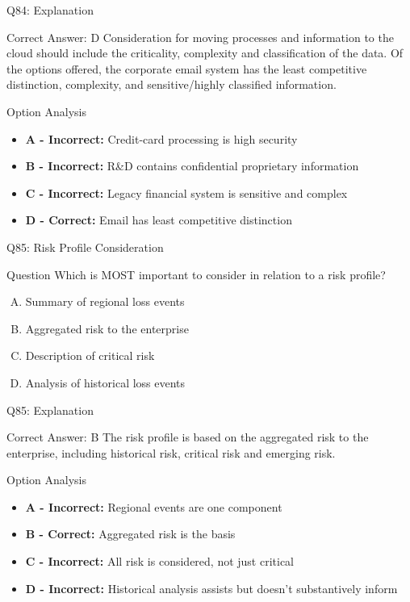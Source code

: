 \documentclass{beamer}
\begin{document}
	\begin{frame}{Q84: Explanation}
		\begin{block}{Correct Answer: D}
			Consideration for moving processes and information to the cloud should include the criticality, complexity and classification of the data. Of the options offered, the corporate email system has the least competitive distinction, complexity, and sensitive/highly classified information.
		\end{block}
		\begin{block}{Option Analysis}
			\begin{itemize}
				\item \textbf{A - Incorrect:} Credit-card processing is high security
				\item \textbf{B - Incorrect:} R\&D contains confidential proprietary information
				\item \textbf{C - Incorrect:} Legacy financial system is sensitive and complex
				\item \textbf{D - Correct:} Email has least competitive distinction
			\end{itemize}
		\end{block}
	\end{frame}
	
	\begin{frame}{Q85: Risk Profile Consideration}
		\begin{block}{Question}
			Which is MOST important to consider in relation to a risk profile?
		\end{block}
		\begin{enumerate}[(A)]
			\item Summary of regional loss events
			\item Aggregated risk to the enterprise
			\item Description of critical risk
			\item Analysis of historical loss events
		\end{enumerate}
	\end{frame}
	
	\begin{frame}{Q85: Explanation}
		\begin{block}{Correct Answer: B}
			The risk profile is based on the aggregated risk to the enterprise, including historical risk, critical risk and emerging risk.
		\end{block}
		\begin{block}{Option Analysis}
			\begin{itemize}
				\item \textbf{A - Incorrect:} Regional events are one component
				\item \textbf{B - Correct:} Aggregated risk is the basis
				\item \textbf{C - Incorrect:} All risk is considered, not just critical
				\item \textbf{D - Incorrect:} Historical analysis assists but doesn't substantively inform
			\end{itemize}
		\end{block}
	\end{frame}
	
\end{document}

